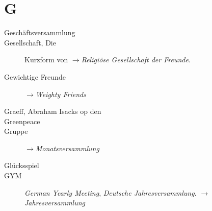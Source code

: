 \section*{G}

\articlesize

\begin{description}
 \item[Geschäftsversammlung]

 \item[Gesellschaft, Die] Kurzform von $\to$\textit{Religiöse Gesellschaft der Freunde}.

\item[Gewichtige Freunde] $\to$\textit{Weighty Friends}

 \item[Graeff, Abraham Isacks op den]

 \item[Greenpeace]

\item[Gruppe] $\to$\textit{Monatsversammlung}

\item[Glücksspiel]

\item[GYM] \textit{German Yearly Meeting}, \textit{Deutsche Jahresversammlung}. $\to$\textit{Jahresversammlung}
 \end{description}

\normalsize